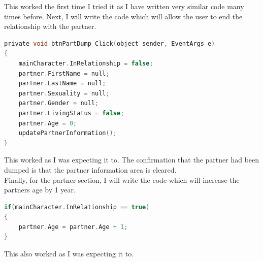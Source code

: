 This worked the first time I tried it as I have written very similar code many times before.
Next, I will write the code which will allow the user to end the relationship with the partner.
\begin{lstlisting}[language=c, style=csharp, caption=Dump partner algorithm]
private void btnPartDump_Click(object sender, EventArgs e)
{
    mainCharacter.InRelationship = false;
    partner.FirstName = null;
    partner.LastName = null;
    partner.Sexuality = null;
    partner.Gender = null;
    partner.LivingStatus = false;
    partner.Age = 0;
    updatePartnerInformation();
}
\end{lstlisting}
This worked as I was expecting it to. The confirmation that the partner had been dumped is that the partner information area is cleared.\\
Finally, for the partner section, I will write the code which will increase the partners age by 1 year.
\begin{lstlisting}[language=c, style=csharp, caption=Increase age of partner]
if(mainCharacter.InRelationship == true)
{
    partner.Age = partner.Age + 1;
}
\end{lstlisting}
This also worked as I was expecting it to.